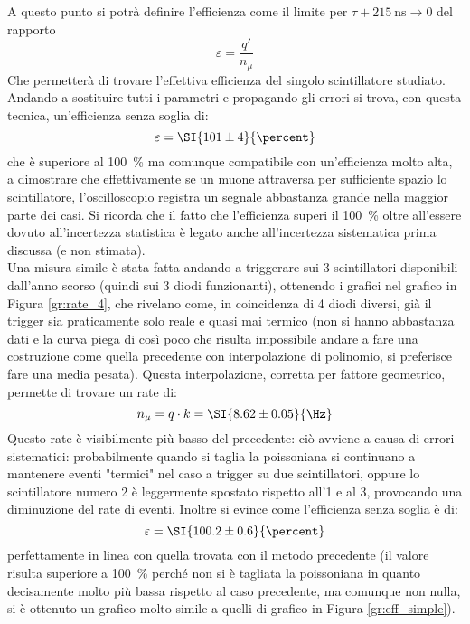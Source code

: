 A questo punto si potrà definire l'efficienza come il limite per $\tau + \SI{215}{\nano\s} \to 0$ del rapporto
\begin{equation}
	\varepsilon = \frac{q'}{n_\mu}
	\label{eq:eff}
\end{equation}
Che permetterà di trovare l'effettiva efficienza del singolo scintillatore studiato. Andando a sostituire tutti i parametri e propagando gli errori si trova, con questa tecnica, un'efficienza senza soglia di:
\begin{equation}
  \varepsilon = \SI{101 \pm 4}{\percent}
\end{equation}
che è superiore al \SI{100}{\percent} ma comunque compatibile con un'efficienza molto alta, a dimostrare che effettivamente se un muone attraversa per sufficiente spazio lo scintillatore, l'oscilloscopio registra un segnale abbastanza grande nella maggior parte dei casi. Si ricorda che il fatto che l'efficienza superi il \SI{100}{\percent} oltre all'essere dovuto all'incertezza statistica \`e legato anche all'incertezza sistematica prima discussa (e non stimata).\\

Una misura simile è stata fatta andando a triggerare sui 3 scintillatori disponibili dall'anno scorso (quindi sui 3 diodi funzionanti), ottenendo i grafici nel grafico in Figura \ref{gr:rate_4}, che rivelano come, in coincidenza di 4 diodi diversi, già il trigger sia praticamente solo reale e quasi mai termico (non si hanno abbastanza dati e la curva piega di così poco che risulta impossibile andare a fare una costruzione come quella precedente con interpolazione di polinomio, si preferisce fare una media pesata). Questa interpolazione, corretta per fattore geometrico, permette di trovare un rate di:
\begin{equation}
  n_\mu = q \cdot k = \SI{8.62 \pm 0.05}{\Hz}
\end{equation}
Questo rate è visibilmente più basso del precedente: ciò avviene a causa di errori sistematici: probabilmente quando si taglia la poissoniana si continuano a mantenere eventi "termici" nel caso a trigger su due scintillatori, oppure lo scintillatore numero 2 è leggermente spostato rispetto all'1 e al 3, provocando una diminuzione del rate di eventi.
Inoltre si evince come l'efficienza senza soglia è di:
\begin{equation}
  \varepsilon = \SI{100.2 \pm 0.6}{\percent}
\end{equation}
perfettamente in linea con quella trovata con il metodo precedente (il valore risulta superiore a \SI{100}{\percent} perché non si è tagliata la poissoniana in quanto decisamente molto più bassa rispetto al caso precedente, ma comunque non nulla, si \`e ottenuto un grafico molto simile a quelli di grafico in Figura \ref{gr:eff_simple}).

